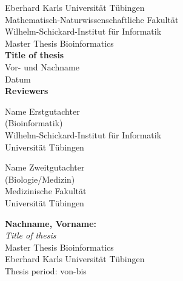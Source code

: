 \documentclass[twoside,12pt,a4paper]{report}
\begin{document}
 
\begin{titlepage}
 \begin{center}
  {\LARGE Eberhard Karls Universit\"at T\"ubingen}\\
  {\large Mathematisch-Naturwissenschaftliche Fakult\"at \\
Wilhelm-Schickard-Institut f\"ur Informatik\\[4cm]}
  {\huge Master Thesis Bioinformatics\\[2cm]}
  {\Large\bf  Title of thesis\\[1.5cm]}
 {\large Vor- und Nachname}\\[0.5cm]
Datum\\[4cm]
{\small\bf Reviewers}\\[0.5cm]
  \parbox{7cm}{\begin{center}{\large Name Erstgutachter}\\
   (Bioinformatik)\\
  {\footnotesize Wilhelm-Schickard-Institut f\"ur Informatik\\
	Universit\"at T\"ubingen}\end{center}}\hfill\parbox{7cm}{\begin{center}
  {\large Name Zweitgutachter}\\
  (Biologie/Medizin)\\
  {\footnotesize Medizinische Fakult\"at\\
	Universit\"at T\"ubingen}\end{center}
 }
  \end{center}
\end{titlepage}


\thispagestyle{empty}
\vspace*{\fill}
\begin{minipage}{11.2cm}
\textbf{Nachname, Vorname:}\\
\emph{Title of thesis}\\ Master Thesis Bioinformatics\\
Eberhard Karls Universit\"at T\"ubingen\\
Thesis period: von-bis
\end{minipage}
\newpage
\end{document}
